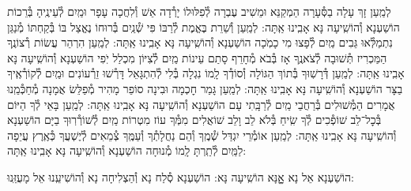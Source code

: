 \documentclass[twoside, openany, parskip=half, 11pt]{book}
\begin{document}
\begin{small}
לְמַֽעַן זָךְ עָלָה בַסְּ֯עָרָה הַמְקַנֵּא וּמֵשִׁיב עֶבְרָה
לְ֯פִלּוּלוֹ יָרְ֯דָה אֵשׁ וְ֯לִחֲכָה עָפָר וּמַֽיִם לְ֯עֵינֶֽיהָ בְּ֯רֵכוֹת הוֹשַׁעְנָא וְ֯הוֹשִֽׁיעָה נָּא אָבִֽינוּ אַֽתָּה:
לְמַֽעַן וְ֯שֵׁרֵת בֶּאֱמֶת לְ֯רַבּוֹ פִּי שְׁ֯נַֽיִם בְּ֯רוּחוֹ נֶאֱצַל בּוֹ
בְּ֯קַחְתּוֹ מְ֯נַגֵּן נִתְמַלְּ֯אוּ גֵּבִים מַֽיִם לְ֯פָצוּ מִי כָמֹֽכָה הוֹשַׁעְנָא וְ֯הוֹשִֽׁיעָה נָּא אָבִֽינוּ אַֽתָּה:
לְמַֽעַן הִרְהֵר עֲשׂוֹת רְ֯צוֹנֶֽךָ הַמַּכְרִיז תְּ֯שׁוּבָה לְ֯צֹאנֶֽךָ
אָז בְּ֯בֹא מְ֯חָרֵף סָתַם עֵינוֹת מַֽיִם לְ֯צִיּוֹן מִכְלַל יֹֽפִי הוֹשַׁעְנָא וְ֯הוֹשִֽׁיעָה נָּא אָבִֽינוּ אַֽתָּה:
לְמַֽעַן דְּ֯רָשֽׁוּךָ בְּ֯תוֹךְ הַגּוֹלָה וְ֯סוֹדְ֯ךָ לָֽמוֹ נִגְלָה
בְּ֯לִי לְ֯הִתְגָּאֵל דָּרְ֯שׁוּ זֵרְ֯עוֹנִים וּמַֽיִם לְ֯קוֹרְ֯אֶֽיךָ בַצָּר הוֹשַׁעְנָא וְ֯הוֹשִֽׁיעָה נָּא אָבִֽינוּ אַֽתָּה:
לְמַֽעַן גָּמַר חׇכְמָה וּבִינָה סוֹפֵר מָהִיר מְ֯פַלֵּשׂ אֲמָנָה
מְ֯חַכְּ֯מֵֽנוּ אֲמָרִים הַמְּ֯שׁוּלִים בְּ֯רַחֲבֵי מַֽיִם לְ֯רַבָּֽתִי עָם הוֹשַׁעְנָא וְ֯הוֹשִֽׁיעָה נָּא אָבִֽינוּ אַֽתָּה:
לְמַֽעַן בָּאֵי לְ֯ךָ הַיּוֹם בְּ֯כׇל־לֵב שׁוֹפְ֯כִים לְ֯ךָ שִֽׂיחַ בְּ֯לֹא לֵב וָלֵב
שׁוֹאֲלִים מִמְּ֯ךָ עוֹז מִטְרוֹת מַֽיִם לְ֯שׁוֹרְ֯רֽוּךָ בַיָּם הוֹשַׁעְנָא וְ֯הוֹשִֽׁיעָה נָּא אָבִֽינוּ אַֽתָּה:
לְמַֽעַן אוֹמְ֯רֵי יִגְדַּל שְׁ֯מֶֽךָ וְ֯הֵם נַחֲלָתְ֯ךָ וְ֯עַמֶּֽךָ
צְ֯מֵאִים לְ֯יֶשְׁעֲךָ כְּ֯אֶֽרֶץ עֲיֵפָה לַמַּֽיִם לְ֯תַֽרְתָּ לָֽמוֹ מְ֯נוּחָה הוֹשַׁעְנָא וְ֯הוֹשִֽׁיעָה נָּא אָבִֽינוּ אַֽתָּה:

\end{small}

\begin{large}
\shatzvkahal
הוֹשַׁעְנָא אֵל נָא אׇׇׇׇנָּא הוֹשִֽׁיעָה נָּא:
הוֹשַׁעְנָא סְ֯לַח נָא וְ֯הַצְלִיחָה נָא וְ֯הוֹשִׁיעֵֽנוּ אֵל מָעֻזֵּֽנוּ:

\end{large}
\end{document}
